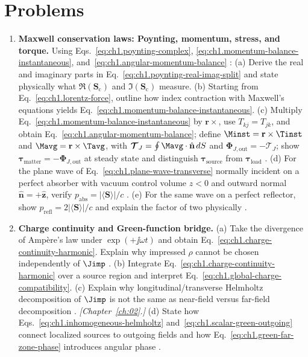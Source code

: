 \section{Problems}
\label{sec:ch01.8}

\begin{enumerate}
\item \textbf{Maxwell conservation laws: Poynting, momentum, stress, and torque.}
Using Eqs.~\eqref{eq:ch1.poynting-complex}, \eqref{eq:ch1.momentum-balance-instantaneous}, and~\eqref{eq:ch1.angular-momentum-balance} \cite{poynting1884,maxwell1873,stratton1941}:
(a) Derive the real and imaginary parts in Eq.~\eqref{eq:ch1.poynting-real-imag-split} and state physically what $\Re(\mathbf{S}_\mathrm{c})$ and $\Im(\mathbf{S}_\mathrm{c})$ measure.
(b) Starting from Eq.~\eqref{eq:ch1.lorentz-force}, outline how index contraction with Maxwell's equations yields Eq.~\eqref{eq:ch1.momentum-balance-instantaneous}.
(c) Multiply Eq.~\eqref{eq:ch1.momentum-balance-instantaneous} by $\mathbf{r}\times$, use $T_{kj}=T_{jk}$, and obtain Eq.~\eqref{eq:ch1.angular-momentum-balance}; define $\Minst=\mathbf{r}\times\Tinst$ and $\Mavg=\mathbf{r}\times\Tavg$, with $\boldsymbol{\mathcal{T}}_J=\oint\Mavg\cdot\hat{\mathbf{n}}\,dS$ and $\boldsymbol{\Phi}_{J,\mathrm{out}}=-\boldsymbol{\mathcal{T}}_J$; show $\boldsymbol{\tau}_{\mathrm{matter}}=-\boldsymbol{\Phi}_{J,\mathrm{out}}$ at steady state and distinguish $\boldsymbol{\tau}_{\mathrm{source}}$ from $\boldsymbol{\tau}_{\mathrm{load}}$ \cite{beth1936}.
(d) For the plane wave of Eq.~\eqref{eq:ch1.plane-wave-transverse} normally incident on a perfect absorber with vacuum control volume $z<0$ and outward normal $\hat{\mathbf{n}}=+\hat{\mathbf{z}}$, verify $p_{\mathrm{abs}}=|\langle\mathbf{S}\rangle|/c$ \cite{stratton1941}.
(e) For the same wave on a perfect reflector, show $p_{\mathrm{refl}}=2|\langle\mathbf{S}\rangle|/c$ and explain the factor of two physically \cite{maxwell1873,stratton1941}.

\item \textbf{Charge continuity and Green-function bridge.}
(a) Take the divergence of Amp\`ere's law under $\exp(+\jj\omega t)$ and obtain Eq.~\eqref{eq:ch1.charge-continuity-harmonic}. Explain why impressed $\rho$ cannot be chosen independently of $\Jimp$ \cite{maxwell1873,stratton1941}.
(b) Integrate Eq.~\eqref{eq:ch1.charge-continuity-harmonic} over a source region and interpret Eq.~\eqref{eq:ch1.global-charge-compatibility}.
(c) Explain why longitudinal/transverse Helmholtz decomposition of $\Jimp$ is not the same as near-field versus far-field decomposition \cite{stratton1941,jackson1999}. \emph{[Chapter~\ref{ch:02}.]}
(d) State how Eqs.~\eqref{eq:ch1.inhomogeneous-helmholtz} and~\eqref{eq:ch1.scalar-green-outgoing} connect localized sources to outgoing fields and how Eq.~\eqref{eq:ch1.green-far-zone-phase} introduces angular phase \cite{tai1994,stratton1941}.


\end{enumerate}
